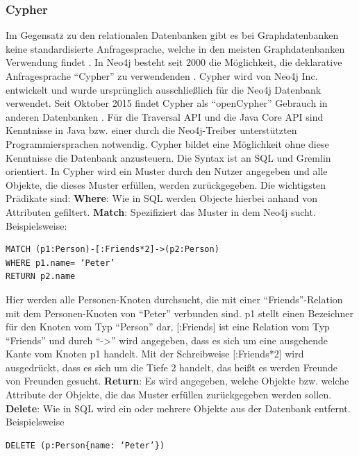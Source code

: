 \subsubsection{Cypher}
Im Gegensatz zu den relationalen Datenbanken gibt es bei Graphdatenbanken keine standardisierte Anfragesprache, welche in den meisten Graphdatenbanken Verwendung findet \parencite{han2011survey}. In Neo4j besteht seit 2000 die Möglichkeit, die deklarative Anfragesprache “Cypher” zu verwendenden  \parencite{francis2018cypher}. Cypher wird von Neo4j Inc. entwickelt und wurde ursprünglich ausschließlich für die Neo4j Datenbank verwendet. Seit Oktober 2015  findet Cypher als “openCypher” Gebrauch in anderen Datenbanken \parencite{francis2018cypher}. Für die Traversal API und die Java Core API sind Kenntnisse in Java bzw. einer durch die Neo4j-Treiber unterstützten Programmiersprachen notwendig. Cypher bildet eine Möglichkeit ohne diese Kenntnisse die  Datenbank anzusteuern\parencite{vukotic2015neo4j}. Die Syntax ist an SQL und Gremlin orientiert. In Cypher wird ein Muster durch den Nutzer angegeben und alle Objekte, die dieses Muster erfüllen, werden zurückgegeben. Die wichtigsten  Prädikate sind: \newline
\textbf{Where}: Wie in SQL werden Objecte hierbei anhand von Attributen gefiltert. \newline
\textbf{Match}: Spezifiziert das Muster in dem Neo4j sucht. Beispielsweise:
\begin{Verbatim}[frame=single]
MATCH (p1:Person)-[:Friends*2]->(p2:Person) 
WHERE p1.name= ‘Peter’ 
RETURN p2.name
\end{Verbatim}
Hier werden alle Personen-Knoten durchsucht, die mit einer “Friends”-Relation mit dem Personen-Knoten von “Peter” verbunden sind. p1 stellt einen Bezeichner für den Knoten vom Typ “Person” dar, [:Friends] ist eine Relation vom Typ “Friends” und durch “->” wird angegeben, dass es sich um eine ausgehende Kante vom Knoten p1 handelt. Mit der Schreibweise [:Friends*2] wird ausgedrückt, dass es sich um die Tiefe 2 handelt, das heißt es werden Freunde von Freunden gesucht. \newline
\textbf{Return}: Es wird angegeben, welche Objekte bzw. welche Attribute der Objekte, die das Muster erfüllen zurückgegeben werden sollen.\newline
\textbf{Delete}: Wie in SQL  wird ein  oder mehrere Objekte aus der Datenbank entfernt. Beispielsweise
\begin{Verbatim}[frame=single]
DELETE (p:Person{name: ‘Peter’})  
\end{Verbatim}
